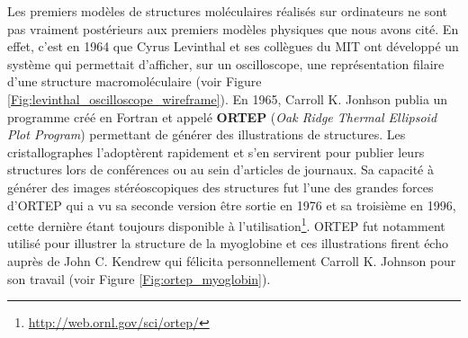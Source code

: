 
Les premiers modèles de structures moléculaires réalisés sur ordinateurs ne sont pas vraiment postérieurs aux premiers modèles physiques que nous avons cité. En effet, c'est en 1964 que Cyrus Levinthal et ses collègues du MIT ont développé un système qui permettait d'afficher, sur un oscilloscope, une représentation filaire d'une structure macromoléculaire (voir Figure \ref{Fig:levinthal_oscilloscope_wireframe}).
En 1965, Carroll K. Jonhson publia un programme créé en Fortran et appelé \textbf{ORTEP} (\textit{Oak Ridge Thermal Ellipsoid Plot Program}) permettant de générer des illustrations de structures. Les cristallographes l'adoptèrent rapidement et s'en servirent pour publier leurs structures lors de conférences ou au sein d'articles de journaux. Sa capacité à générer des images stéréoscopiques des structures fut l'une des grandes forces d'ORTEP qui a vu sa seconde version être sortie en 1976 et sa troisième en 1996, cette dernière étant toujours disponible à l'utilisation\footnote{\url{http://web.ornl.gov/sci/ortep/}}. ORTEP fut notamment utilisé pour illustrer la structure de la myoglobine et ces illustrations firent écho auprès de John C. Kendrew qui félicita personnellement Carroll K. Johnson pour son travail (voir Figure \ref{Fig:ortep_myoglobin}).

